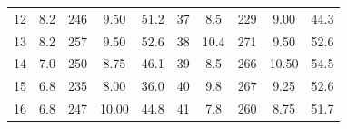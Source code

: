 \documentclass[12pt,B5paper,]{book}
\begin{document}
\begin{table}[H]
\begin{tabular}{ccccc|ccccc}
12                   & 8.2                                                      & 246                                                       & 9.50                                                      & 51.2                                                     & 37                   & 8.5                                                      & 229                                                       & 9.00                                                      & 44.3                                                     \\
13                   & 8.2                                                      & 257                                                       & 9.50                                                      & 52.6                                                     & 38                   & 10.4                                                     & 271                                                       & 9.50                                                      & 52.6                                                     \\
14                   & 7.0                                                      & 250                                                       & 8.75                                                      & 46.1                                                     & 39                   & 8.5                                                      & 266                                                       & 10.50                                                     & 54.5                                                     \\
15                   & 6.8                                                      & 235                                                       & 8.00                                                      & 36.0                                                     & 40                   & 9.8                                                      & 267                                                       & 9.25                                                      & 52.6                                                     \\
16                   & 6.8                                                      & 247                                                       & 10.00                                                     & 44.8                                                     & 41                   & 7.8                                                      & 260                                                       & 8.75                                                      & 51.7                                                     \\

\end{tabular}
\end{table}
\end{document}
